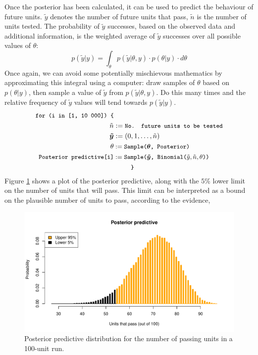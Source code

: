 \documentclass[11pt,a4paper,article]{memoir} %
\begin{document}
Once the posterior has been calculated, it can be used to predict the behaviour of future units. $\tilde{y}$ denotes the number of future units that pass, $\tilde{n}$ is the number of units tested. The probability of $\tilde{y}$ successes, based on the observed data and additional information, is the weighted average of $\tilde{y}$ successes over all possible values of $\theta$:
\begin{equation}
	p(\tilde{y}|y) = \int_{\theta}p(\tilde{y}|\theta, y)\cdot p(\theta|y) \cdot d\theta
\end{equation}
Once again, we can avoid some potentially mischievous mathematics by approximating this integral using a computer: draw samples of $\theta$ based on $p(\theta|y)$, then sample a value of $\tilde{y}$ from $p(\tilde{y}|\theta, y)$. Do this many times and the relative frequency of $\tilde{y}$ values will tend towards $p(\tilde{y}|y)$.
\begin{align*}
\small{\texttt{for (i in [1, 10 000]) \{}} &\\
	\tilde{n} &:= \small{\texttt{No. future units to be tested}} \\
	\boldsymbol{\tilde{y}} &:= (0, 1, \dots, \tilde{n}) \\
	\theta &:= \small{\texttt{Sample(}}\boldsymbol{\theta}\small{\texttt{, Posterior)}} \\
	\small{\texttt{Posterior predictive[i]}} &:= \small{\texttt{Sample(}}\boldsymbol{\tilde{y}}\small{\texttt{, Binomial(}}\tilde{y}, \tilde{n}, \theta\small{\texttt{))}}\\
	&\quad\quad \small{\texttt{ \} }}
\end{align*}
Figure \ref{fig:posterior_predictive} shows a plot of the posterior predictive, along with the $5\%$ lower limit on the number of units that will pass. This limit can be interpreted as a bound on the plausible number of units to pass, according to the evidence,
\begin{figure}
\includegraphics[width=\textwidth]{posterior_predictive.pdf}
\caption{Posterior predictive distribution for the number of passing units in a 100-unit run.}
\label{fig:posterior_predictive}
\end{figure}
\end{document}
